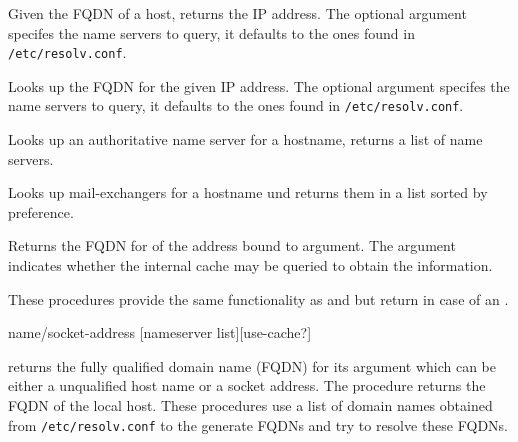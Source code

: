 \begin{desc}
  Given the FQDN of a host,  returns the IP address.
  The optional argument specifes the name servers to query, it defaults
  to the ones found in \texttt{/etc/resolv.conf}. 
\end{desc}

\begin{desc}
  Looks up the FQDN for the given IP address. The optional argument
  specifes the name servers to query, it defaults to the ones found in
  \texttt{/etc/resolv.conf}.
\end{desc}

\begin{desc}
  Looks up an authoritative name server for a hostname, returns a list
  of name servers.
\end{desc}

\begin{desc}
  Looks up mail-exchangers for a hostname und returns them in a list
  sorted by preference.
\end{desc}
\begin{desc}
  Returns the FQDN for of the address bound to argument. The argument
    indicates whether the internal cache may be queried to
  obtain the information.
\end{desc}

\begin{desc}
  These procedures provide the same functionality as
   and  but return \sharpf{} in
  case of an .
\end{desc}

 {name/socket-address [nameserver list][use-cache?]}{\fqdn}
\begin{desc}
   returns the fully qualified domain name (FQDN) for
  its argument which can be either a unqualified host name or a socket
  address.  The procedure  returns the FQDN of the
  local host. These procedures use a list of domain names obtained
  from \texttt{/etc/resolv.conf} to the generate FQDNs and try to
  resolve these FQDNs.
\end{desc}

